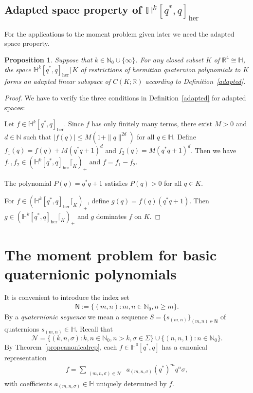 \documentclass[11pt,a4paper]{amsart}
\newtheorem{proposition}[theorem]{Proposition}
\theoremstyle{definition}
\begin{document}
\subsection{Adapted space property of $\mathbb{H}^{k}[q^{*},q]_{\mathrm{her}}$}
\label{sec4.4}

For the applications to the moment problem given later we need the adapted
space property.
%
\begin{proposition}%
\label{adaptedH_L}
Suppose that $k\in \mathbb{N}_{0}\cup \{\infty \}$. For any closed subset
$K $ of $ \mathbb{R}^{4}\cong \mathbb{H}$, the space
${\mathbb{H}^{k}[q^{*},q]_{\mathrm{her}}\lceil K}$ of restrictions of hermitian
quaternion polynomials to $K$ forms an adapted linear subspace of
$C(K; \mathbb{R})$ according to Definition~\ref{adapted}.
\end{proposition}

\begin{proof}
We have to verify the three conditions in Definition~\ref{adapted} for
adapted spaces:

 Let
$f \in \mathbb{H}^{k}[q^{*}, q]_{\mathrm{her}}$. Since $f$ has only finitely
many terms, there exist $M > 0$ and $d\in \mathbb{N}$ such that
$|f(q)| \leq M(1 + \|q\|^{2d})$ for all $q \in \mathbb{H}$. Define
$f_{1}(q) = f(q) + M(q^{*}q + 1)^{d}$ and
$f_{2}(q) = M(q^{*}q + 1)^{d}$. Then we have
$f_{1},f_{2} \in (\mathbb{H}^{k}[q^{*}, q]_{\mathrm{her}}\lceil _{K})_{+}$
and $f=f_{1}-f_{2}$.

 The polynomial $P(q) = q^{*}q + 1$ satisfies
$P(q) > 0$ for all $q \in K$.

 For
$f \in (\mathbb{H}^{k}[q^{*}, q]_{\mathrm{her}}\lceil _{K})_{+}$, define
$g(q) = f(q)(q^{*}q + 1)$. Then
$g\in (\mathbb{H}^{k}[q^{*}, q]_{\mathrm{her}}\lceil _{K})_{+}$ and
$g$ dominates $f$ on $K$.
\end{proof}
%

\section{The moment problem for basic quaternionic polynomials}
\label{mpbasic}

It is convenient to introduce the index set
%
\begin{align}
{\mathsf{{N}}} :=\{(m,n): m,n\in \mathbb{N}_{0}, n\geq m\}.
\label{eq47}
\end{align}
%
By a \emph{quaternionic sequence} we mean a sequence
$S=\{s_{(m,n)}\}_{(m,n) \in \mathsf{{N}}}$ of quaternions
$s_{(m,n)}\in \mathbb{H}$. Recall that
%
\begin{equation*}
\mathcal{N}=\{(k,n,\sigma ):k,n\in \mathbb{N}_{0}, n>k,\sigma \in
\Sigma \}\cup \{(n,n,1):n\in \mathbb{N}_{0}\}.
\end{equation*}
%
By Theorem~\ref{propcanonicalrep}, each
$f\in \mathbb{H}^{0}[q^{*}, q]$ has a canonical representation
%
\begin{align}
\label{canonicalrep1}
f=\sum _{\substack{(m,n,\sigma )\in \mathcal{N}}} ~ a_{(m,n,\sigma )} (q^{*})^{m}
q^{n} \sigma ,%
\end{align}
%
with coefficients $a_{(m,n,\sigma )}\in \mathbb{H}$ uniquely determined
by $f$.
\end{document}
